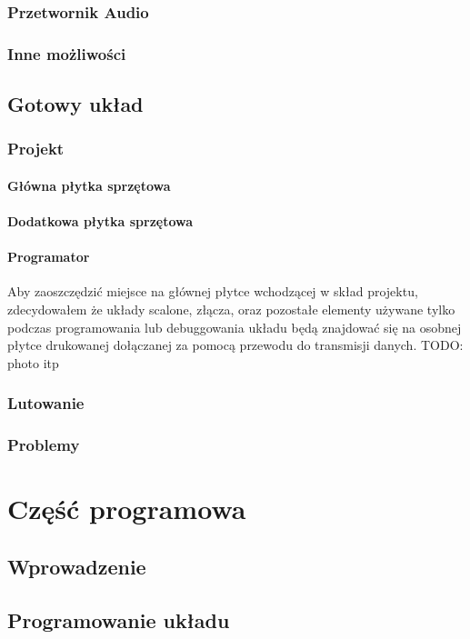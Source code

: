 \documentclass[a4paper,12pt]{book}
\begin{document}
			\subsection{Przetwornik Audio}
			\subsection{Inne możliwości}
		\section{Gotowy układ}
			\subsection{Projekt}
				\subsubsection{Główna płytka sprzętowa}
				\subsubsection{Dodatkowa płytka sprzętowa}
				\subsubsection{Programator}
					\label{sec:programator}
					Aby zaoszczędzić miejsce na głównej płytce wchodzącej w skład projektu, zdecydowałem że układy scalone, złącza, oraz pozostałe elementy używane tylko podczas programowania lub debuggowania układu będą znajdować się na osobnej płytce drukowanej dołączanej za pomocą przewodu do transmisji danych. TODO: photo itp
			\subsection{Lutowanie}
			\subsection{Problemy}

	\chapter{Część programowa}
		\section{Wprowadzenie}
		\section{Programowanie układu}
		
\end{document}
